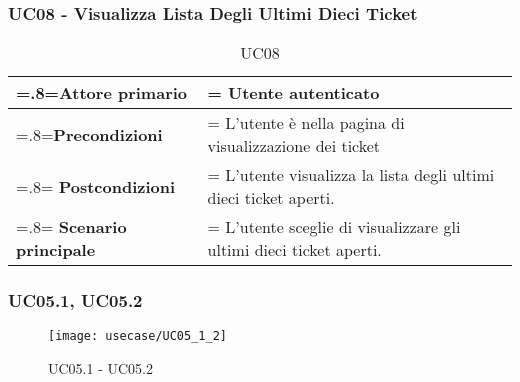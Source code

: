 \subsubsection{UC08 - Visualizza Lista Degli Ultimi Dieci Ticket}  
 \begin{table}[H]
                \centering
                \renewcommand{\arraystretch}{1.8}
                \renewcommand\tabularxcolumn[1]{m{#1}}
                \begin{tabularx}{0.9\textwidth} {
                    >{\hsize=.8\hsize\linewidth=\hsize}X
                    >{\hsize=1.2\hsize\linewidth=\hsize}X}
                    \hline
                    \textbf{Attore primario} & Utente autenticato \\
                    \hline
                    \textbf{Precondizioni} & L'utente è nella pagina di visualizzazione dei ticket \\
                    \hline
                    \textbf{Postcondizioni} & L'utente visualizza la lista degli ultimi dieci ticket aperti. \\
                    \hline
                    \textbf{Scenario principale} & L'utente sceglie di visualizzare gli ultimi dieci ticket aperti.\\
                    \hline
                \end{tabularx}
                \caption{UC08}
            \end{table}            
    

\subsubsection{UC05.1, UC05.2}

\begin{figure}[H]
    \centering 
    \texttt{[image: usecase/UC05\_1\_2]}
    \caption{UC05.1 - UC05.2}
\end{figure}
